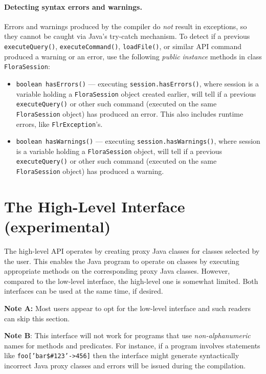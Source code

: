\paragraph{Detecting syntax errors and warnings.}
Errors and warnings produced
by the \FLSYSTEM compiler do \emph{not} result in exceptions, so they
cannot be caught via Java's try-catch mechanism. To detect if a previous
\texttt{executeQuery()},  \texttt{executeCommand()}, \texttt{loadFile()},
or similar API command produced a warning or an error, use the following
\emph{public} \emph{instance}  methods in class \texttt{FloraSession}:
\begin{itemize}
\item  \texttt{boolean hasErrors()} --- executing
  \texttt{session.hasErrors()}, where session is a variable holding
  a \texttt{FloraSession}
  object created earlier,
  will tell if a previous \texttt{executeQuery()} or other such
  command (executed on the same \texttt{FloraSession} object)
  has produced an error. This also includes runtime errors, like
  \texttt{FlrException}'s. 
\item  \texttt{boolean hasWarnings()} --- executing
  \texttt{session.hasWarnings()}, where session is a  variable holding
  a \texttt{FloraSession}
  object, will tell if a previous \texttt{executeQuery()} or other such
  command (executed on the same \texttt{FloraSession} object)
  has produced a warning.
\end{itemize}




\section{The High-Level Interface (experimental)}

The high-level API operates by creating proxy Java classes for 
\FLSYSTEM classes selected by the user.
This enables the Java program to operate on \FLSYSTEM classes by
executing appropriate methods on the corresponding proxy Java classes.
However, compared to the low-level interface, the high-level one is
somewhat limited.  Both interfaces can be used at the same time, if desired.

\textbf{Note A:}  
Most users appear to opt for the low-level interface and such readers
can skip this section.

\textbf{Note B}: This interface will not work for \FLSYSTEM programs that
use \emph{non-alphanumeric} names for methods and predicates. For instance,
if a program involves statements like \texttt{foo['bar\$\#123'->456]} then
the interface might generate syntactically incorrect Java proxy classes and
errors will be issued during the compilation. 

